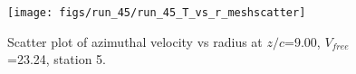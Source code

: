 \begin{figure}[H]
\centering
\texttt{[image: figs/run\_45/run\_45\_T\_vs\_r\_meshscatter]}
\caption{Scatter plot of azimuthal velocity vs radius at $z/c$=9.00, $V_{free}$=23.24, station 5.}
\label{fig:run_45_T_vs_r_meshscatter}
\end{figure}


